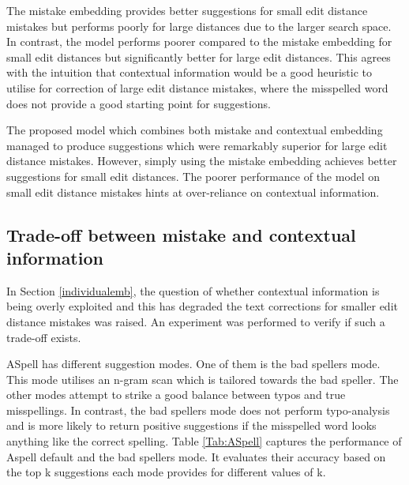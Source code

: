 \documentclass[11pt,a4paper]{article}
\begin{document}
The mistake embedding provides better suggestions for small edit distance mistakes but performs poorly for large distances due to the larger search space. In contrast, the model performs poorer compared to the mistake embedding for small edit distances but significantly better for large edit distances. This agrees with the intuition that contextual information would be a good heuristic to utilise for correction of large edit distance mistakes, where the misspelled word does not provide a good starting point for suggestions.

The proposed model which combines both mistake and contextual embedding managed to produce suggestions which were remarkably superior for large edit distance mistakes. However, simply using the mistake embedding achieves better suggestions for small edit distances. The poorer performance of the model on small edit distance mistakes hints at over-reliance on contextual information. 

\subsection{Trade-off between mistake and contextual information}\label{tradeoff}
In Section \ref{individualemb}, the question of whether contextual information is being overly exploited and this has degraded the text corrections for smaller edit distance mistakes was raised. An experiment was performed to verify if such a trade-off exists. 

ASpell has different suggestion modes. One of them is the bad spellers mode.
This mode utilises an n-gram scan which is tailored towards the bad speller. The other modes attempt to strike a good balance between typos and true misspellings. In contrast, the bad spellers mode does not perform typo-analysis and is more likely to return positive suggestions if the misspelled word looks anything like the correct spelling. Table \ref{Tab:ASpell} captures the performance of Aspell default and the bad spellers mode. It evaluates their accuracy based on the top k suggestions each mode provides for different values of k.
\end{document}
